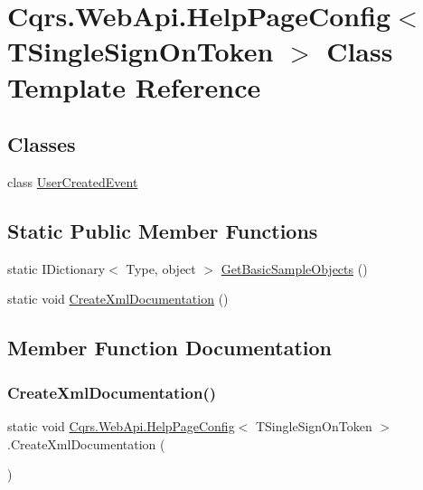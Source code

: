 \hypertarget{classCqrs_1_1WebApi_1_1HelpPageConfig}{}\section{Cqrs.\+Web\+Api.\+Help\+Page\+Config$<$ T\+Single\+Sign\+On\+Token $>$ Class Template Reference}
\label{classCqrs_1_1WebApi_1_1HelpPageConfig}
\subsection*{Classes}
\begin{DoxyCompactItemize}
\item 
class \hyperlink{classCqrs_1_1WebApi_1_1HelpPageConfig_1_1UserCreatedEvent}{User\+Created\+Event}
\end{DoxyCompactItemize}
\subsection*{Static Public Member Functions}
\begin{DoxyCompactItemize}
\item 
static I\+Dictionary$<$ Type, object $>$ \hyperlink{classCqrs_1_1WebApi_1_1HelpPageConfig_a9bbf87bfdedcdebf58a8cbb3f40e004a_a9bbf87bfdedcdebf58a8cbb3f40e004a}{Get\+Basic\+Sample\+Objects} ()
\item 
static void \hyperlink{classCqrs_1_1WebApi_1_1HelpPageConfig_a56b93cb4675afc645d9368b9afeeac27_a56b93cb4675afc645d9368b9afeeac27}{Create\+Xml\+Documentation} ()
\end{DoxyCompactItemize}


\subsection{Member Function Documentation}
\mbox{\label{classCqrs_1_1WebApi_1_1HelpPageConfig_a56b93cb4675afc645d9368b9afeeac27_a56b93cb4675afc645d9368b9afeeac27}} 
\subsubsection{\texorpdfstring{Create\+Xml\+Documentation()}{CreateXmlDocumentation()}}
{\footnotesize\ttfamily static void \hyperlink{classCqrs_1_1WebApi_1_1HelpPageConfig}{Cqrs.\+Web\+Api.\+Help\+Page\+Config}$<$ T\+Single\+Sign\+On\+Token $>$.Create\+Xml\+Documentation (\begin{DoxyParamCaption}{ }\end{DoxyParamCaption})\hspace{0.3cm}{\ttfamily [static]}}

